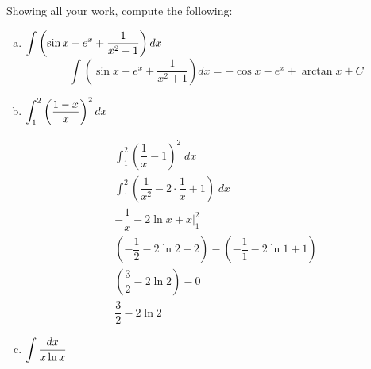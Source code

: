 \documentclass[12pt,letterpaper]{exam}
\begin{document}
\begin{questions}
Showing all your work, compute the following: \par\vspace{0.2cm}
	\begin{enumerate}[(a)]
	\item $\displaystyle\int \left( \sin x - e^x + \dfrac{1}{x^2 + 1} \right) dx$ \pvspace{3cm}
		\[
		\int \left( \sin x - e^x + \dfrac{1}{x^2 + 1} \right) dx= -\cos x - e^x + \arctan x + C
		\] \pvspace{4.5cm}
	
	\item $\displaystyle\int_1^2 \left( \dfrac{1 - x}{x} \right)^2 dx$ \vfill
	
		\[
		\begin{gathered}
		\int_1^2 \left( \dfrac{1}{x} - 1 \right)^2 \;dx \\[0.3cm]
		\int_1^2 \left( \dfrac{1}{x^2} - 2 \cdot \dfrac{1}{x} + 1 \right)\; dx \\[0.3cm]
		-\dfrac{1}{x} - 2 \ln x + x \bigg|_1^2 \\[0.3cm]
		\left(-\dfrac{1}{2} - 2 \ln 2 + 2 \right) - \left(-\dfrac{1}{1} - 2 \ln 1 + 1 \right) \\[0.3cm]
		\left( \dfrac{3}{2} - 2 \ln 2 \right) - 0 \\[0.3cm]
		\dfrac{3}{2} - 2\ln 2
		\end{gathered}
		\] \vfill
	
	\newpage
	
	\item $\displaystyle\int \dfrac{dx}{x \ln x}$ \pvspace{1cm}
	

\end{enumerate}
\end{questions}
\end{document}
